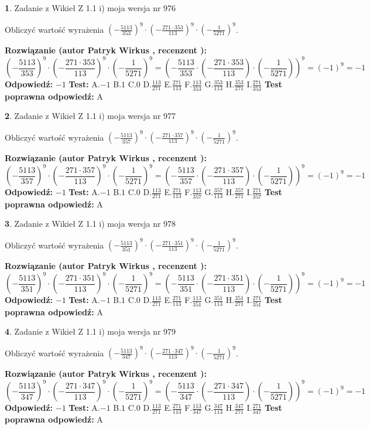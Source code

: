 \documentclass[12pt, a4paper]{article}
\theoremstyle{definition} %
\newtheorem{zad}{}
\newcommand{\zadStart}[1]{\begin{zad}#1\newline}
\newcommand{\zadStop}{\end{zad}}
\newcommand{\rozwStart}[2]{\noindent \textbf{Rozwiązanie (autor #1 , recenzent #2): }\newline}
\newcommand{\rozwStop}{\newline}
\newcommand{\odpStart}{\noindent \textbf{Odpowiedź:}\newline}
\newcommand{\odpStop}{\newline}
\newcommand{\testStart}{\noindent \textbf{Test:}\newline}
\newcommand{\testStop}{\newline}
\newcommand{\kluczStart}{\noindent \textbf{Test poprawna odpowiedź:}\newline}
\newcommand{\kluczStop}{\newline}
\begin{document}
\zadStart{Zadanie z Wikieł Z 1.1 i) moja wersja nr 976}

Obliczyć wartość wyrażenia $(-\frac{5113}{353})^{9} \cdot (-\frac{271 \cdot 353}{113})^{9} \cdot (-\frac{1}{5271})^{9}$.
\zadStop
\rozwStart{Patryk Wirkus}{}
$$(-\frac{5113}{353})^{9} \cdot (-\frac{271 \cdot 353}{113})^{9} \cdot (-\frac{1}{5271})^{9} = (-\frac{5113}{353} \cdot (-\frac{271 \cdot 353}{113}) \cdot (-\frac{1}{5271}))^{9} = (-1)^{9} = -1$$
\rozwStop
\odpStart
$-1$
\odpStop
\testStart
A.$-1$ B.$1$ C.$0$ D.$\frac{113}{271}$ E.$\frac{271}{113}$
F.$\frac{113}{353}$ G.$\frac{353}{113}$
H.$\frac{353}{271}$
I.$\frac{271}{353}$
\testStop
\kluczStart
A
\kluczStop



\zadStart{Zadanie z Wikieł Z 1.1 i) moja wersja nr 977}

Obliczyć wartość wyrażenia $(-\frac{5113}{357})^{9} \cdot (-\frac{271 \cdot 357}{113})^{9} \cdot (-\frac{1}{5271})^{9}$.
\zadStop
\rozwStart{Patryk Wirkus}{}
$$(-\frac{5113}{357})^{9} \cdot (-\frac{271 \cdot 357}{113})^{9} \cdot (-\frac{1}{5271})^{9} = (-\frac{5113}{357} \cdot (-\frac{271 \cdot 357}{113}) \cdot (-\frac{1}{5271}))^{9} = (-1)^{9} = -1$$
\rozwStop
\odpStart
$-1$
\odpStop
\testStart
A.$-1$ B.$1$ C.$0$ D.$\frac{113}{271}$ E.$\frac{271}{113}$
F.$\frac{113}{357}$ G.$\frac{357}{113}$
H.$\frac{357}{271}$
I.$\frac{271}{357}$
\testStop
\kluczStart
A
\kluczStop



\zadStart{Zadanie z Wikieł Z 1.1 i) moja wersja nr 978}

Obliczyć wartość wyrażenia $(-\frac{5113}{351})^{9} \cdot (-\frac{271 \cdot 351}{113})^{9} \cdot (-\frac{1}{5271})^{9}$.
\zadStop
\rozwStart{Patryk Wirkus}{}
$$(-\frac{5113}{351})^{9} \cdot (-\frac{271 \cdot 351}{113})^{9} \cdot (-\frac{1}{5271})^{9} = (-\frac{5113}{351} \cdot (-\frac{271 \cdot 351}{113}) \cdot (-\frac{1}{5271}))^{9} = (-1)^{9} = -1$$
\rozwStop
\odpStart
$-1$
\odpStop
\testStart
A.$-1$ B.$1$ C.$0$ D.$\frac{113}{271}$ E.$\frac{271}{113}$
F.$\frac{113}{351}$ G.$\frac{351}{113}$
H.$\frac{351}{271}$
I.$\frac{271}{351}$
\testStop
\kluczStart
A
\kluczStop



\zadStart{Zadanie z Wikieł Z 1.1 i) moja wersja nr 979}

Obliczyć wartość wyrażenia $(-\frac{5113}{347})^{9} \cdot (-\frac{271 \cdot 347}{113})^{9} \cdot (-\frac{1}{5271})^{9}$.
\zadStop
\rozwStart{Patryk Wirkus}{}
$$(-\frac{5113}{347})^{9} \cdot (-\frac{271 \cdot 347}{113})^{9} \cdot (-\frac{1}{5271})^{9} = (-\frac{5113}{347} \cdot (-\frac{271 \cdot 347}{113}) \cdot (-\frac{1}{5271}))^{9} = (-1)^{9} = -1$$
\rozwStop
\odpStart
$-1$
\odpStop
\testStart
A.$-1$ B.$1$ C.$0$ D.$\frac{113}{271}$ E.$\frac{271}{113}$
F.$\frac{113}{347}$ G.$\frac{347}{113}$
H.$\frac{347}{271}$
I.$\frac{271}{347}$
\testStop
\kluczStart
A
\kluczStop
\end{document}
